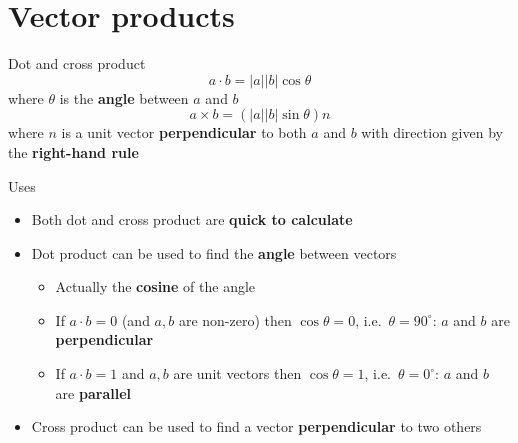 \part{Vector products}
\frame{\partpage}

\begin{frame}{Dot and cross product}
	\pause $$a \cdot b = |a| |b| \cos \theta$$
	where $\theta$ is the \textbf{angle} between $a$ and $b$
	\vspace{2ex}
	\pause $$a \times b = (|a| |b| \sin \theta) n$$
	where $n$ is a unit vector \textbf{perpendicular} to both $a$ and $b$
	with direction given by the \textbf{right-hand rule}
\end{frame}

\begin{frame}{Uses}
	\begin{itemize}
		\pause\item Both dot and cross product are \textbf{quick to calculate}
		\pause\item Dot product can be used to find the \textbf{angle} between vectors
			\begin{itemize}
				\pause\item Actually the \textbf{cosine} of the angle
				\pause\item If $a \cdot b = 0$ (and $a,b$ are non-zero) then $\cos \theta = 0$, i.e.\ $\theta = 90^\circ$: $a$ and $b$ are \textbf{perpendicular}
				\pause\item If $a \cdot b = 1$ and $a,b$ are unit vectors then $\cos \theta = 1$, i.e.\ $\theta = 0^\circ$: $a$ and $b$ are \textbf{parallel}
			\end{itemize}
		\pause\item Cross product can be used to find a vector \textbf{perpendicular} to two others
	\end{itemize}
\end{frame}

